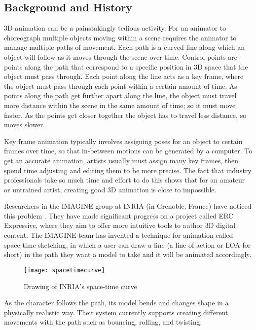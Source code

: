 \subsection{Background and History}
3D animation can be a painstakingly tedious activity. For an animator to choreograph multiple objects moving within a scene requires the animator to manage multiple paths of movement. Each path is a curved line along which an object will follow as it moves through the scene over time. Control points are points along the path that correspond to a specific position in 3D space that the object must pass through. Each point along the line acts as a key frame, where the object must pass through each point within a certain amount of time. As points along the path get further apart along the line, the object must travel more distance within the scene in the same amount of time; so it must move faster. As the points get closer together the object has to travel less distance, so moves slower.

Key frame animation typically involves assigning poses for an object to certain frames over time, so that in-between motions can be generated by a computer. To get an accurate animation, artists usually must assign many key frames, then spend time adjusting and editing them to be more precise. The fact that industry professionals take so much time and effort to do this shows that for an amateur or untrained artist, creating good 3D animation is close to impossible.

Researchers in the IMAGINE group at INRIA (in Grenoble, France) have noticed this problem \cite{hal}. They have made significant progress on a project called ERC Expressive, where they aim to offer more intuitive tools to author 3D digital content. The IMAGINE team has invented a technique for animation called space-time sketching, in which a user can draw a line (a line of action or LOA for short) in the path they want a model to take and it will be animated accordingly.\\

\begin{figure}[H]
\centering
\texttt{[image: spacetimecurve]}
\caption{Drawing of INRIA's space-time curve}
\label{fig:spaceTimeCurve}
\end{figure}

As the character follows the path, its model bends and changes shape in a physically realistic way. Their system currently supports creating different movements with the path such as bouncing, rolling, and twisting.

